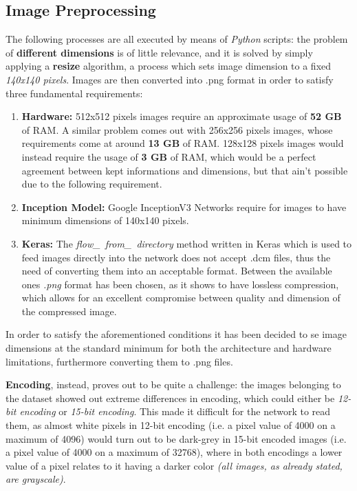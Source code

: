 \documentclass[../main.tex]{subfiles}
\begin{document}
\subsection{Image Preprocessing}
The following processes are all executed by means of \textit{Python} scripts: the problem of \textbf{different dimensions} is of little relevance, and it is solved by simply applying a \textbf{resize} algorithm, a process which sets image dimension to a fixed \textit{140x140 pixels}. Images are then converted into .png format in order to satisfy three fundamental requirements:
\begin{enumerate}
	\item \textbf{Hardware:} 512x512 pixels images require an approximate usage of \textbf{52 GB} of RAM. A similar problem comes out with 256x256 pixels images, whose requirements come at around \textbf{13 GB} of RAM. 128x128 pixels images would instead require the usage of \textbf{3 GB} of RAM, which would be a perfect agreement between kept informations and dimensions, but that ain't possible due to the following requirement.
	\item \textbf{Inception Model:} Google InceptionV3 Networks require for images to have minimum dimensions of 140x140 pixels.
	\item \textbf{Keras:} The \textit{flow\_\ from\_\ directory} method written in Keras which is used to feed images directly into the network does not accept .dcm files, thus the need of converting them into an acceptable format. Between the available ones \textit{.png} format has been chosen, as it shows to have lossless compression, which allows for an excellent compromise between quality and dimension of the compressed image.
\end{enumerate}
In order to satisfy the aforementioned conditions it has been decided to se image dimensions at the standard minimum for both the architecture and hardware limitations, furthermore converting them to .png files.

\textbf{Encoding}, instead, proves out to be quite a challenge: the images belonging to the dataset showed out extreme differences in encoding, which could either be \textit{12-bit encoding} or \textit{15-bit encoding}. This made it difficult for the network to read them, as almost white pixels in 12-bit encoding (i.e. a pixel value of 4000 on a maximum of 4096) would turn out to be dark-grey in 15-bit encoded images (i.e. a pixel value of 4000 on a maximum of 32768), where in both encodings a lower value of a pixel relates to it having a darker color \textit{(all images, as already stated, are grayscale)}.
\vspace{5mm}
\end{document}
